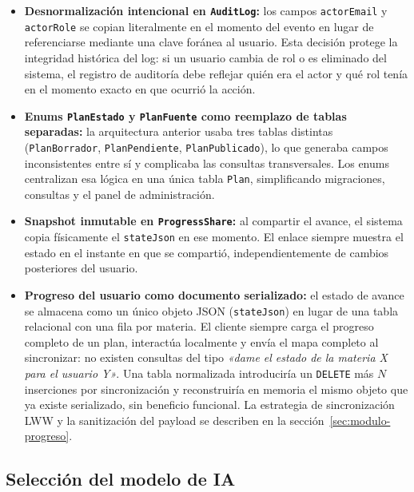 \documentclass[12pt, a4paper]{report}
\begin{document}
\begin{itemize}
  \item \textbf{Desnormalización intencional en \texttt{AuditLog}:} los campos
        \texttt{actorEmail} y \texttt{actorRole} se copian literalmente en el momento del
        evento en lugar de referenciarse mediante una clave foránea al usuario. Esta
        decisión protege la integridad histórica del log: si un usuario cambia de rol o
        es eliminado del sistema, el registro de auditoría debe reflejar quién era el actor
        y qué rol tenía en el momento exacto en que ocurrió la acción.

  \item \textbf{Enums \texttt{PlanEstado} y \texttt{PlanFuente} como reemplazo de tablas
        separadas:} la arquitectura anterior usaba tres tablas distintas
        (\texttt{PlanBorrador}, \texttt{PlanPendiente}, \texttt{PlanPublicado}), lo que
        generaba campos inconsistentes entre sí y complicaba las consultas transversales.
        Los enums centralizan esa lógica en una única tabla \texttt{Plan}, simplificando
        migraciones, consultas y el panel de administración.

  \item \textbf{Snapshot inmutable en \texttt{ProgressShare}:} al compartir el avance, el
        sistema copia físicamente el \texttt{stateJson} en ese momento. El enlace siempre
        muestra el estado en el instante en que se compartió, independientemente de cambios
        posteriores del usuario.

  \item \textbf{Progreso del usuario como documento serializado:} el estado de avance
        se almacena como un único objeto JSON (\texttt{stateJson}) en lugar de una tabla
        relacional con una fila por materia. El cliente siempre carga el progreso completo
        de un plan, interactúa localmente y envía el mapa completo al sincronizar: no
        existen consultas del tipo \emph{«dame el estado de la materia X para el usuario Y»}.
        Una tabla normalizada introduciría un \texttt{DELETE} más $N$ inserciones por
        sincronización y reconstruiría en memoria el mismo objeto que ya existe serializado,
        sin beneficio funcional. La estrategia de sincronización LWW y la sanitización del
        payload se describen en la sección~\ref{sec:modulo-progreso}.
\end{itemize}

\subsection{Selección del modelo de IA}
\label{sec:modelos-ia-descartados}
\end{document}
